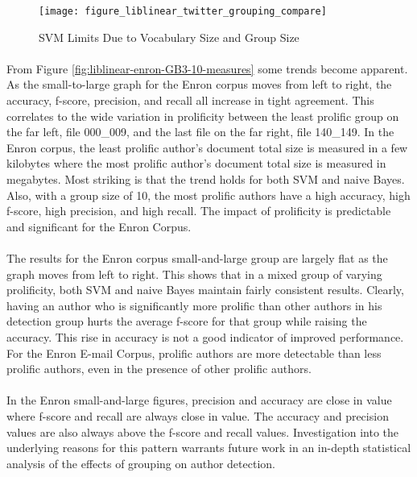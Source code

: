 \begin{figure}[htbp!]
	\begin{center}
	\centering
	\texttt{[image: figure\_liblinear\_twitter\_grouping\_compare]}
	\caption{SVM Limits Due to Vocabulary Size and Group Size}
	\label{fig:liblinear-twitter-GB3-10-measures}
	\end{center}
\end{figure}
	
	\paragraph*{} From Figure \ref{fig:liblinear-enron-GB3-10-measures} some trends become apparent.  As the small-to-large graph for the Enron corpus moves from left to right, the accuracy, f-score, precision, and recall all increase in tight agreement.  This correlates to the wide variation in prolificity between the least prolific group on the far left, file 000\_009, and the last file on the far right, file 140\_149.  In the Enron corpus, the least prolific author's document total size is measured in a few kilobytes where the most prolific author's document total size is measured in megabytes.  Most striking is that the trend holds for both SVM and naive Bayes.  Also, with a group size of 10, the most prolific authors have a high accuracy, high f-score, high precision, and high recall.  The impact of prolificity is predictable and significant for the Enron Corpus.
	\paragraph*{} The results for the Enron corpus small-and-large group are largely flat as the graph moves from left to right.  This shows that in a mixed group of varying prolificity, both SVM and naive Bayes maintain fairly consistent results.  Clearly, having an author who is significantly more prolific than other authors in his detection group hurts the average f-score for that group while raising the accuracy.  This rise in accuracy is not a good indicator of improved performance.  For the Enron E-mail Corpus, prolific authors are more detectable than less prolific authors, even in the presence of other prolific authors.
	\paragraph*{} In the Enron small-and-large figures, precision and accuracy are close in value where f-score and recall are always close in value.  The accuracy and precision values are also always above the f-score and recall values.  Investigation into the underlying reasons for this pattern warrants future work in an in-depth statistical analysis of the effects of grouping on author detection.
